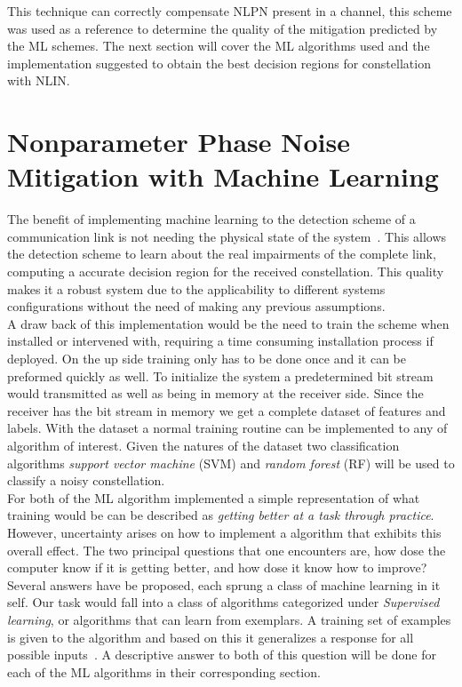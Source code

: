 This technique  can correctly compensate NLPN present in a channel, this scheme was used as a reference to determine the quality of the mitigation predicted by the ML schemes. The next section will cover the ML algorithms used and the implementation suggested to obtain the best decision regions for constellation with NLIN. 
\section{Nonparameter Phase Noise Mitigation with Machine Learning  }

The benefit of implementing machine learning to the detection scheme of a communication link is not needing the physical state of the system~\cite{zibar2015application}. This allows the detection scheme to learn about the real impairments of the complete link, computing a accurate decision region for the received constellation. This quality makes it a robust system due to the applicability to different systems configurations without the need of making any previous assumptions.~\\

 A draw back of this implementation would be the need to train the scheme when installed or intervened with, requiring a time consuming installation process if deployed. On the up side training only has to be done once and it can be preformed quickly as well. To initialize the system a predetermined bit stream would transmitted as well as being in memory at the receiver side. Since the receiver has the bit stream in memory we get a complete dataset of features and labels. With the dataset a normal training routine can be implemented to any of algorithm of interest. Given the natures of the dataset two classification algorithms \textit{support vector machine} (SVM) and \textit{random forest} (RF) will be used to classify a noisy constellation.~\\  


For both of the ML algorithm implemented a simple representation of what training would be can be described as \emph{getting better at a task through practice}. However, uncertainty arises on how to implement a algorithm that exhibits this overall effect. The two principal questions that one encounters are, how dose the computer know if it is getting better, and how dose it know how to improve?  Several answers have be proposed, each sprung a class of machine learning in it self. Our task would fall into a class of algorithms categorized under \textit{Supervised learning}, or algorithms that can learn from exemplars. A training set of examples is given to the algorithm and based on this it generalizes a response for all possible inputs~\cite{marsland2014machine}. A descriptive answer to both of this question will be done for each of the ML algorithms in their corresponding section.





